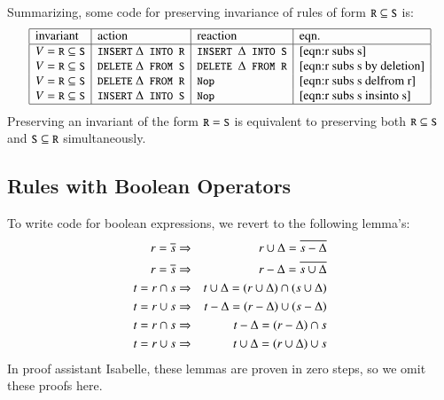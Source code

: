 \documentclass{elsarticle}
\begin{document}
Summarizing, some code for preserving invariance of rules of form $\text{\tt\small R}\subseteq\text{\tt\small S}$ is:
\[\begin{array}{|l|l|l|l|}
\hline
\text{invariant}&\text{action}&\text{reaction}&\text{eqn.}\\ \hline
\full=\code{R}\subs\code{S}&\code{INSERT}\ \Delta\code{ INTO R}&\code{INSERT }\Delta\code{ INTO S}&\ref{eqn:r subs s}\\
\full=\code{R}\subs\code{S}&\code{DELETE}\ \Delta\code{ FROM S}&\code{DELETE }\Delta\code{ FROM R}&\ref{eqn:r subs s by deletion}\\
\full=\code{R}\subs\code{S}&\code{DELETE}\ \Delta\code{ FROM R}&\code{Nop}&\ref{eqn:r subs s delfrom r}\\
\full=\code{R}\subs\code{S}&\code{INSERT}\ \Delta\code{ INTO S}&\code{Nop}&\ref{eqn:r subs s insinto s}\\ \hline
\end{array}\]
Preserving an invariant of the form $\text{\tt\small R}=\text{\tt\small S}$ is equivalent to preserving both $\text{\tt\small R}\subseteq\text{\tt\small S}$ and $\text{\tt\small S}\subseteq\text{\tt\small R}$ simultaneously.

\subsection{Rules with Boolean Operators}
	To write code for boolean expressions,
	we revert to the following lemma's:
\begin{eqnarray}
r=\overline{s}&\Rightarrow&r\cup\Delta=\overline{s-\Delta}\label{lbl:Preserve r = -s with Ins Delta into r}\\
r=\overline{s}&\Rightarrow&r-\Delta=\overline{s\cup\Delta}\label{lbl:Preserve r = -s with Del Delta from r}\\
t=r\cap s&\Rightarrow&t\cup\Delta=(r\cup\Delta)\cap(s\cup\Delta)\label{lbl:Preserve t=r inter s with Ins Delta into t}\\
t=r\cup s&\Rightarrow&t-\Delta=(r-\Delta)\cup(s-\Delta)\label{lbl:Preserve t=r union s with Del Delta from t}\\
t=r\cap s&\Rightarrow&t-\Delta=(r-\Delta)\cap s\label{lbl:Preserve t=r inter s with Del Delta from t}\\
t=r\cup s&\Rightarrow&t\cup\Delta=(r\cup\Delta)\cup s\label{lbl:Preserve t=r union s with Ins Delta into t}
\end{eqnarray}
	In proof assistant Isabelle, these lemmas are proven in zero steps, so we omit these proofs here.
\end{document}
